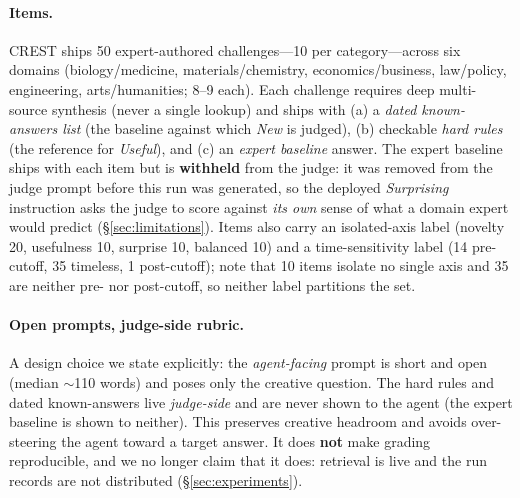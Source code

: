 \paragraph{Items.} CREST ships 50 expert-authored challenges---10 per category---across six domains (biology/medicine, materials/chemistry, economics/business, law/policy, engineering, arts/humanities; 8--9 each). Each challenge requires deep multi-source synthesis (never a single lookup) and ships with (a) a \emph{dated known-answers list} (the baseline against which \emph{New} is judged), (b) checkable \emph{hard rules} (the reference for \emph{Useful}), and (c) an \emph{expert baseline} answer. The expert baseline ships with each item but is \textbf{withheld} from the judge: it was removed from the judge prompt before this run was generated, so the deployed \emph{Surprising} instruction asks the judge to score against \emph{its own} sense of what a domain expert would predict (\S\ref{sec:limitations}). Items also carry an isolated-axis label (novelty 20, usefulness 10, surprise 10, balanced 10) and a time-sensitivity label (14 pre-cutoff, 35 timeless, 1 post-cutoff); note that 10 items isolate no single axis and 35 are neither pre- nor post-cutoff, so neither label partitions the set.

\paragraph{Open prompts, judge-side rubric.} A design choice we state explicitly: the \emph{agent-facing} prompt is short and open (median $\sim$110 words) and poses only the creative question. The hard rules and dated known-answers live \emph{judge-side} and are never shown to the agent (the expert baseline is shown to neither). This preserves creative headroom and avoids over-steering the agent toward a target answer. It does \textbf{not} make grading reproducible, and we no longer claim that it does: retrieval is live and the run records are not distributed (\S\ref{sec:experiments}).

